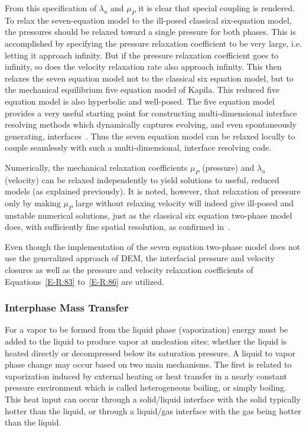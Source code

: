 From this specification of $\lambda_u$ and $\mu_P$ it is clear
that special coupling is rendered.  To relax the seven-equation model to
the ill-posed classical six-equation model, the pressures should be
relaxed toward a single pressure for both phases.  This is
accomplished by specifying the pressure relaxation coefficient to be
very large, i.e. letting it approach infinity.  But if the pressure
relaxation coefficient goes to infinity, so does the velocity
relaxation rate also approach infinity.  This then relaxes the
seven equation model not to the classical six equation model, but to the
mechanical equilibrium five equation model of Kapila.  This reduced
five equation model is also hyperbolic and well-posed. The five equation
model provides a very useful starting point for constructing
multi-dimensional interface resolving methods which dynamically
captures evolving, and even spontaneously generating,
interfaces~\cite{Saurel_2009}. Thus the seven equation model
can be relaxed locally to couple seamlessly with such a
multi-dimensional, interface resolving code.

Numerically, the mechanical relaxation coefficients $\mu_P$
(pressure) and $\lambda_u$ (velocity) can be relaxed independently to
yield solutions to useful, reduced models (as explained previously).  It
is noted, however, that relaxation of pressure only by making $\mu_P$
large without relaxing velocity will indeed give ill-posed and
unstable numerical solutions, just as the classical six equation
two-phase model does, with sufficiently fine spatial resolution, as
confirmed in~\cite{SEM,Herrard_2005}.

Even though the implementation of the seven equation two-phase
model does not use
the generalized approach of DEM, the interfacial pressure and velocity
closures as well as the pressure and velocity relaxation coefficients
of Equations~\eqref{E-R:83} to~\eqref{E-R:86} are utilized.
\subsubsection{Interphase Mass Transfer}
For a vapor to be formed from the liquid phase (vaporization) energy
must be added to the liquid to produce vapor at nucleation sites;
whether the liquid is heated directly or decompressed below its
saturation pressure.  A liquid to vapor phase change may occur based
on two main mechanisms.  The first is related to vaporization induced
by external heating or heat transfer in a nearly constant pressure
environment which is called heterogeneous boiling, or simply
boiling.  This heat input can occur through a solid/liquid
interface with the solid typically hotter than the liquid, or through
a liquid/gas interface with the gas being hotter than the liquid.

